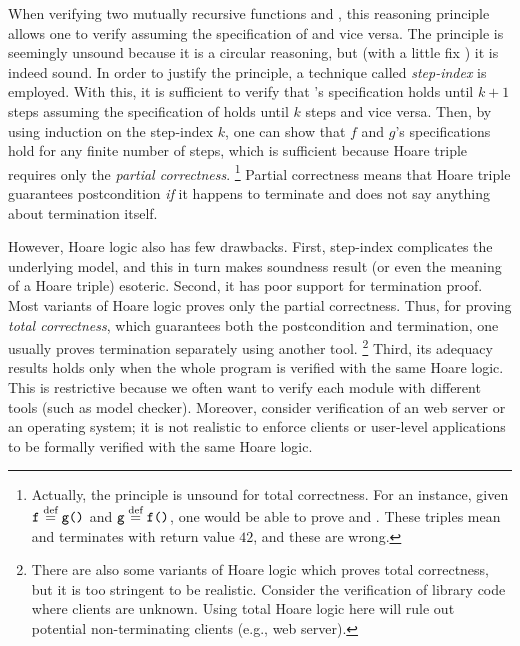 \noindent When verifying two mutually recursive functions  and , this reasoning principle allows one to verify  assuming the specification of  and vice versa.
The principle is seemingly unsound because it is a circular reasoning, but (with a little fix%
) it is indeed sound. %
In order to justify the principle, a technique called {\it step-index} is employed.
With this, it is sufficient to verify that 's specification holds until $k+1$ steps assuming the specification of  holds until $k$ steps and vice versa.
Then, by using induction on the step-index $k$, one can show that $f$ and $g$'s specifications hold for any finite number of steps, which is sufficient because Hoare triple requires only the {\it partial correctness}.
\footnote{Actually, the principle is unsound for total correctness. For an instance, given $\texttt{f} \stackrel{\text{def}}{=} \texttt{g()}$ and $\texttt{g} \stackrel{\text{def}}{=} \texttt{f()}$, one would be able to prove  and .
  These triples mean  and  terminates with return value $42$, and these are wrong. }
Partial correctness means that Hoare triple guarantees postcondition {\it if} it happens to terminate and does not say anything about termination itself.




However, Hoare logic also has few drawbacks.
First, step-index complicates the underlying model, and this in turn makes soundness result (or even the meaning of a Hoare triple) esoteric.
Second, it has poor support for termination proof.
Most variants of Hoare logic proves only the partial correctness.
Thus, for proving {\it total correctness}, which guarantees both the postcondition and termination, one usually proves termination separately using another tool.
\footnote{There are also some variants of Hoare logic which proves total correctness, but it is too stringent to be realistic. Consider the verification of library code where clients are unknown.
Using total Hoare logic here will rule out potential non-terminating clients (e.g., web server).}
Third, its adequacy results holds only when the whole program is verified with the same Hoare logic. This is restrictive because we often want to verify each module with different tools (such as model checker).
Moreover, consider verification of an web server or an operating system; it is not realistic to enforce clients or user-level applications to be formally verified with the same Hoare logic.








